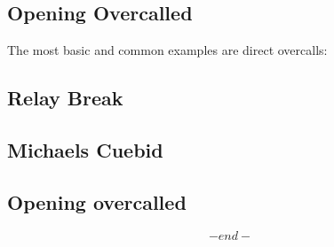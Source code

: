 \documentclass{article}
\begin{document}
\begin{multicols}{2}
\subsection{Opening Overcalled}
The most basic and common examples are direct overcalls:

\subsection{Relay Break}
\subsection{Michaels Cuebid}
\subsection{Opening overcalled}

\columnbreak
$$ -end- $$

\end{multicols}
\end{document}
